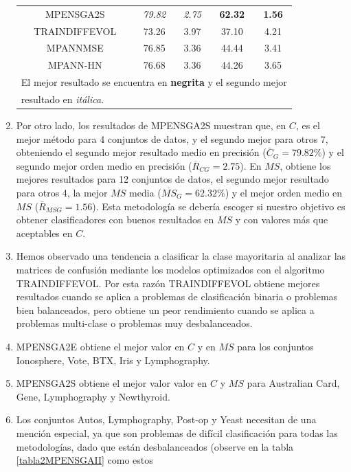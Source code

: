 \begin{enumerate}
\begin{table}[!htb]
\begin{tabular}{ccccc}
\rowcolor[rgb]{0.86,0.94,1}MPENSGA2S & \textit{79.82} & \textit{2.75} & \textbf{62.32} &
\textbf{1.56} \\
\rowcolor[rgb]{0.86,0.94,1}TRAINDIFFEVOL & 73.26 & 3.97 & 37.10 & 4.21 \\
\rowcolor[rgb]{0.86,0.94,1}MPANNMSE & 76.85 & 3.36 & 44.44 & 3.41 \\
\rowcolor[rgb]{0.86,0.94,1}MPANN-HN & 76.68 & 3.36 & 44.26 & 3.65 \\ \hline
\multicolumn{5}{l}{El mejor resultado se encuentra en \textbf{negrita} y el segundo mejor}\\
\multicolumn{5}{l}{resultado en \textit{itálica}.} \\
\end{tabular}
\end{table}
	\item Por otro lado, los resultados de MPENSGA2S muestran que, en $C$, es el mejor
	método para 4 conjuntos de datos, y el segundo mejor para otros 7, obteniendo el segundo mejor
resultado medio en precisión ($\overline{C}_{G}=79.82\%$) y el segundo mejor
orden medio en precisión ($\overline{R}_{CG}=2.75$). En $MS$, obtiene los
mejores resultados para 12 conjuntos de datos, el segundo mejor resultado para otros 4, la mejor
$MS$ media ($\overline{MS}_{G}=62.32\%$) y el mejor orden medio en
$MS$ ($\overline{R}_{MSG}=1.56$). Esta metodología se debería escoger si
nuestro objetivo es obtener clasificadores con buenos resultados en $MS$ y con valores
más que aceptables en $C$.
	\item Hemos observado una tendencia a clasificar la clase mayoritaria al analizar las
matrices de confusión mediante los modelos optimizados con el algoritmo TRAINDIFFEVOL.
Por esta razón TRAINDIFFEVOL obtiene mejores resultados cuando se aplica a problemas de
clasificación binaria o problemas bien balanceados, pero obtiene un peor rendimiento
cuando se aplica a problemas multi-clase o problemas muy desbalanceados.
	\item MPENSGA2E obtiene el mejor valor en $C$ y en $MS$ para
los conjuntos Ionosphere, Vote, BTX, Iris y Lymphography.
	\item MPENSGA2S obtiene el mejor valor valor en $C$ y $MS$ para Australian Card, Gene,
Lymphography y Newthyroid.
	\item Los conjuntos Autos, Lymphography, Post-op y Yeast necesitan de una mención
especial, ya que son problemas de difícil clasificación para todas las metodologías,
dado que están desbalanceados (observe en la tabla \ref{tabla2MPENSGAII} como estos

\end{enumerate}
